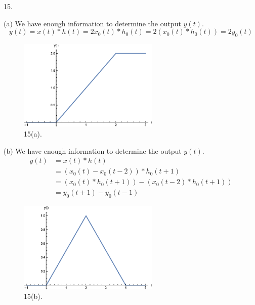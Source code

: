 \documentclass[a4paper]{article}
\begin{document}
15.

(a) We have enough information to determine the output $y(t)$.
$$\boxed{y(t)=x(t)*h(t)=2x_0(t)*h_0(t)=2(x_0(t)*h_0(t))=2y_0(t)}$$
\begin{figure}[H]
    \begin{center}
        \includegraphics[width=0.6\textwidth]{15(a).eps}
    \end{center}
    \caption{15(a).}
\end{figure}

(b) We have enough information to determine the output $y(t)$.
\begin{align*}
    y(t)&=x(t)*h(t)\\
    &=(x_0(t)-x_0(t-2))*h_0(t+1)\\
    &=(x_0(t)*h_0(t+1))-(x_0(t-2)*h_0(t+1))\\
    &=\boxed{y_0(t+1)-y_0(t-1)}
\end{align*}
\begin{figure}[H]
    \begin{center}
        \includegraphics[width=0.6\textwidth]{15(b).eps}
    \end{center}
    \caption{15(b).}
\end{figure}

\end{document}
